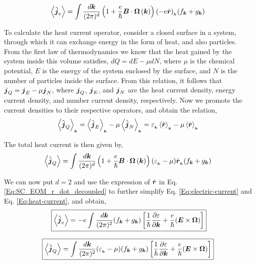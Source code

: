 \documentclass{report}
\renewcommand\vec[1]{\ensuremath\boldsymbol{#1}} %
\begin{document}
\begin{equation} \label{Eq:electric-current}
	\expval{\hat{\vec{j}}_e} = \int \frac{d\vec{k}}{(2\pi)^d} \left(1 + \frac{e}{\hbar} \vec{B} \cdot  \vec{\Omega}\left(\vec{k}\right)\right) (- e \dot{\vec{r}})_{_{\vec{k}}} ({f}_{\vec{k}} + {g}_{\vec{k}})
\end{equation}

To calculate the heat current operator, consider a closed surface in a system, through which it can exchange energy in the form of heat, and also particles. From the first law of thermodynamics we know that the heat gained by the system inside this volume satisfies, $dQ = dE - \mu dN$, where $\mu$ is the chemical potential, $E$ is the energy of the system enclosed by the surface, and $N$ is the number of particles inside the surface. From this relation, it follows that $\vec{j}_Q = \vec{j}_E - \mu \vec{j}_N$, where $\vec{j}_Q$, $\vec{j}_E$, and $\vec{j}_N$ are the heat current density, energy current density, and number current density, respectively. Now we promote the current densities to their respective operators, and obtain the relation,
\begin{equation} 
	\expval{\hat{\vec{j}}_Q}_{_{\vec{k}}} = \expval{\hat{\vec{j}}_E}_{_{\vec{k}}} - \mu \expval{\hat{\vec{j}}_N}_{_{\vec{k}}} = \varepsilon_{_{\vec{k}}} \expval{\dot{\vec{r}}}_{_{\vec{k}}} - \mu \expval{\dot{\vec{r}}}_{_{\vec{k}}}
\end{equation}

The total heat current is then given by,
\begin{equation} \label{Eq:heat-current}
	\expval{\hat{\vec{j}}_Q} = \int \frac{d\vec{k}}{(2\pi)^d} \left(1 + \frac{e}{\hbar} \vec{B} \cdot  \vec{\Omega}\left(\vec{k}\right)\right) (\varepsilon_{_{\vec{k}}} - \mu) \dot{\vec{r}}_{_{\vec{k}}} ({f}_{\vec{k}} + {g}_{\vec{k}})
\end{equation}

We can now put $d = 2$ and use the expression of $\dot{\vec{r}}$ in Eq. \eqref{Eq:SC_EOM_r_dot_decoupled} to further simplify Eq. \eqref{Eq:electric-current} and Eq. \eqref{Eq:heat-current}, and obtain,
\begin{equation}~\label{Eq:electric-current-simplified}
	\boxed{\expval{\hat{\vec{j}}_e} = -e \int \frac{d\vec{k}}{(2\pi)^2} ({f}_{\vec{k}} + {g}_{\vec{k}}) \left[\frac{1}{\hbar} \frac{\partial \varepsilon}{\partial \vec{k}} + \frac{e}{\hbar} (\vec{E}\times\vec{\Omega})\right]}
\end{equation}

\begin{equation} \label{Eq:heat-current-simplified}
	\boxed{\expval{\hat{\vec{j}}_Q} = \int \frac{d\vec{k}}{(2\pi)^2} (\varepsilon_{_{\vec{k}}} - \mu) ({f}_{\vec{k}} + {g}_{\vec{k}}) \left[\frac{1}{\hbar} \frac{\partial \varepsilon}{\partial \vec{k}} + \frac{e}{\hbar} (\vec{E}\times\vec{\Omega})\right]}
\end{equation}
\end{document}
